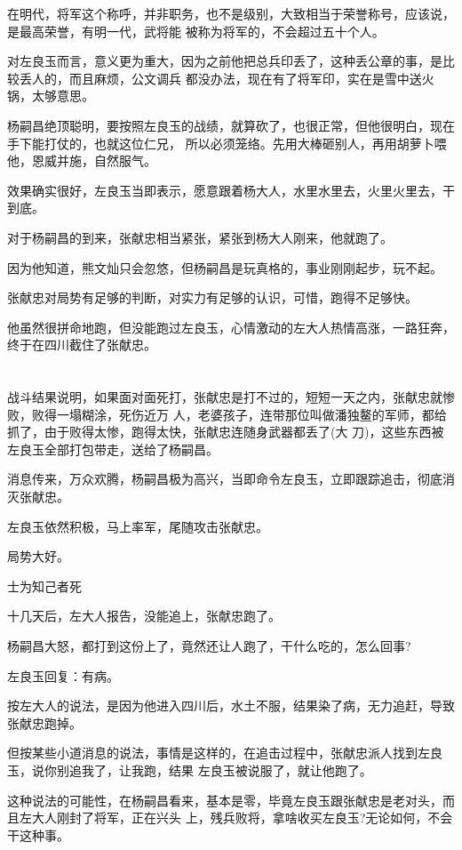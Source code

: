 \documentclass[11pt,a4paper,onecolumn]{article}
\begin{document}
在明代，将军这个称呼，并非职务，也不是级别，大致相当于荣誉称号，应该说，是最高荣誉，有明一代，武将能
被称为将军的，不会超过五十个人。

对左良玉而言，意义更为重大，因为之前他把总兵印丢了，这种丢公章的事，是比较丢人的，而且麻烦，公文调兵
都没办法，现在有了将军印，实在是雪中送火锅，太够意思。

杨嗣昌绝顶聪明，要按照左良玉的战绩，就算砍了，也很正常，但他很明白，现在手下能打仗的，也就这位仁兄，
所以必须笼络。先用大棒砸别人，再用胡萝卜喂他，恩威并施，自然服气。

效果确实很好，左良玉当即表示，愿意跟着杨大人，水里水里去，火里火里去，干到底。

对于杨嗣昌的到来，张献忠相当紧张，紧张到杨大人刚来，他就跑了。

因为他知道，熊文灿只会忽悠，但杨嗣昌是玩真格的，事业刚刚起步，玩不起。

张献忠对局势有足够的判断，对实力有足够的认识，可惜，跑得不足够快。

他虽然很拼命地跑，但没能跑过左良玉，心情激动的左大人热情高涨，一路狂奔，终于在四川截住了张献忠。

\section[\thesection]{}

战斗结果说明，如果面对面死打，张献忠是打不过的，短短一天之内，张献忠就惨败，败得一塌糊涂，死伤近万
人，老婆孩子，连带那位叫做潘独鳌的军师，都给抓了，由于败得太惨，跑得太快，张献忠连随身武器都丢了(大
刀)，这些东西被左良玉全部打包带走，送给了杨嗣昌。

消息传来，万众欢腾，杨嗣昌极为高兴，当即命令左良玉，立即跟踪追击，彻底消灭张献忠。

左良玉依然积极，马上率军，尾随攻击张献忠。

局势大好。

士为知己者死

十几天后，左大人报告，没能追上，张献忠跑了。

杨嗣昌大怒，都打到这份上了，竟然还让人跑了，干什么吃的，怎么回事?

左良玉回复：有病。

按左大人的说法，是因为他进入四川后，水土不服，结果染了病，无力追赶，导致张献忠跑掉。

但按某些小道消息的说法，事情是这样的，在追击过程中，张献忠派人找到左良玉，说你别追我了，让我跑，结果
左良玉被说服了，就让他跑了。

这种说法的可能性，在杨嗣昌看来，基本是零，毕竟左良玉跟张献忠是老对头，而且左大人刚封了将军，正在兴头
上，残兵败将，拿啥收买左良玉?无论如何，不会干这种事。
\end{document}
